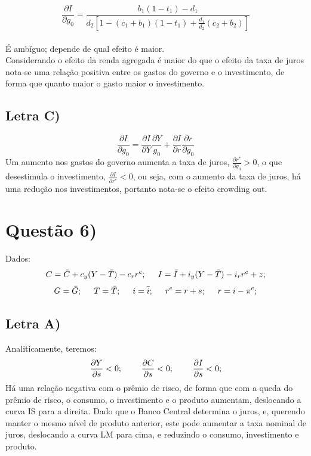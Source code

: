 \documentclass{article}
\begin{document}
\begin{equation}
\frac{\partial I}{\partial g_0} = \frac{b_1(1-t_1)-d_1}{d_2[1-(c_1+b_1)(1-t_1)+\frac{d_1}{d_2}(c_2+b_2)]}
\end{equation}
\\
É ambíguo; depende de qual efeito é maior.\\
Considerando o efeito da renda agregada é maior do que o efeito da taxa de juros nota-se uma relação positiva entre os gastos do governo e o investimento, de forma que quanto maior o gasto maior o investimento.

\subsection*{Letra C)}
\begin{equation}
\frac{\partial I}{\partial g_0} = \frac{\partial I}{\partial Y}\frac{\partial Y}{g_0} + \frac{\partial I}{\partial r}\frac{\partial r}{\partial g_0}
\end{equation}
Um aumento nos gastos do governo aumenta a taxa de juros, $\frac{\partial r^*}{\partial g_0} > 0$, o que desestimula o investimento, $\frac{\partial I}{\partial r^*} < 0$, ou seja, com o aumento da taxa de juros, há uma redução nos investimentos, portanto nota-se o efeito crowding out.

\clearpage

\section*{Questão 6)}
Dados:
$$C = \bar{C} + c_y (Y - \bar{T}) - c_r r^{e}; \hspace{0.5cm} I = \bar{I} + i_y (Y - \bar{T}) - i_r r^{e}+ z;$$
$$ G = \bar{G}; \hspace{0.5cm} T = \bar{T}; \hspace{0.5cm} 
i = \bar{i}; \hspace{0.5cm} r^{e} = r + s; \hspace{0.5cm} r=i-\pi^{e};$$


\subsection*{Letra A)}
Analiticamente, teremos: 
$$
\frac{\partial Y }{\partial s } < 0; \hspace{0.8cm}
\frac{\partial C }{\partial s } < 0; \hspace{0.8cm}
\frac{\partial I }{\partial s } < 0;$$
Há uma relação negativa com o prêmio de risco, de forma que com a queda do prêmio de risco, o consumo, o investimento e o produto aumentam, deslocando a curva IS para a direita. Dado que o Banco Central determina o juros, e, querendo manter o mesmo nível de produto anterior, este pode aumentar a taxa nominal de juros, deslocando a curva LM para cima, e reduzindo o consumo, investimento e produto.
\end{document}
